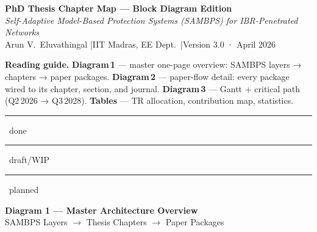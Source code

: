 \documentclass[11pt,a4paper]{article}
\begin{document}
\begin{center}
{\LARGE\bfseries PhD Thesis Chapter Map — Block Diagram Edition}\\[4pt]
{\large\itshape Self-Adaptive Model-Based Protection Systems (SAMBPS)
for IBR-Penetrated Networks}\\[3pt]
{\small Arun V.\ Eluvathingal \quad|\quad IIT Madras, EE Dept.\
\quad|\quad Version 3.0 · April 2026}
\end{center}

\vspace{3pt}
\noindent\colorbox{black!8}{\parbox{\dimexpr\linewidth-2\fboxsep\relax}{\small
\textbf{Reading guide.}
\textbf{Diagram\,1} — master one-page overview: SAMBPS layers → chapters → paper packages.
\textbf{Diagram\,2} — paper-flow detail: every package wired to its chapter, section, and journal.
\textbf{Diagram\,3} — Gantt + critical path (Q2\,2026 → Q3\,2028).
\textbf{Tables} — TR allocation, contribution map, statistics.
\quad\textcolor{donecol}{\rule{0.6cm}{4pt}}~done
\quad\textcolor{wipcol}{\rule{0.6cm}{4pt}}~draft/WIP
\quad\textcolor{plancol}{\rule{0.6cm}{4pt}}~planned
}}

\clearpage
\begin{center}
{\large\bfseries Diagram 1 — Master Architecture Overview}\\[3pt]
{\small SAMBPS Layers $\longrightarrow$ Thesis Chapters $\longrightarrow$ Paper Packages}
\end{center}

\vspace{4pt}
\end{document}
